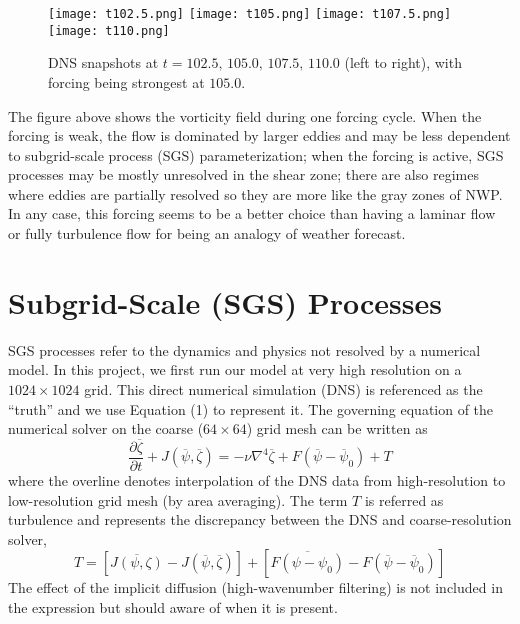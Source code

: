 \documentclass[a4paper,11pt]{article}
\begin{document}
\begin{figure}[h]
 \begin{center}
  \texttt{[image: t102.5.png]}
  \texttt{[image: t105.png]}
  \texttt{[image: t107.5.png]}
  \texttt{[image: t110.png]}  
  \caption{DNS snapshots at $t=102.5,\,105.0,\,107.5,\,110.0$ (left to right), with forcing being strongest at $105.0$.}
 \end{center}
\end{figure}


The figure above shows the vorticity field during one forcing cycle. When the forcing is weak, the flow is dominated by larger eddies and may be less dependent to subgrid-scale process (SGS) parameterization; when the forcing is active, SGS processes may be mostly unresolved in the shear zone; there are also regimes where eddies are partially resolved so they are more like the gray zones of NWP. In any case, this forcing seems to be a better choice than having a laminar flow or fully turbulence flow for being an analogy of weather forecast. 



\section*{Subgrid-Scale (SGS) Processes}

SGS processes refer to the dynamics and physics not resolved by a numerical model. In this project, we first run our model at very high resolution on a $1024\times1024$ grid. This direct numerical simulation (DNS) is referenced as the ``truth'' and we use Equation (1) to represent it. The governing equation of the numerical solver on the coarse ($64\times64$) grid mesh can be written as
\begin{equation}
 \frac{\partial \overline{\zeta}}{\partial t} + J(\overline{\psi}, \overline{\zeta}) = -\nu \nabla^4 \overline{\zeta} + F(\overline{\psi} - \overline{\psi}_0) + T
\end{equation}
where the overline denotes interpolation of the DNS data from high-resolution to low-resolution grid mesh (by area averaging). The term $T$ is referred as turbulence and represents the discrepancy between the DNS and coarse-resolution solver,
\begin{equation}
 T = \left[\overline{J(\psi,\zeta)} - J(\overline{\psi}, \overline{\zeta}) \right] + 
     \left[\overline{F(\psi-\psi_0)} - F(\overline{\psi}-\overline{\psi}_0) \right]
\end{equation}
The effect of the implicit diffusion (high-wavenumber filtering) is not included in the expression but should aware of when it is present.
\end{document}
